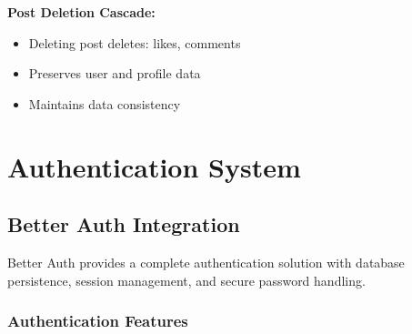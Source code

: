 \documentclass[12pt,a4paper]{report}
\begin{document}
\textbf{Post Deletion Cascade:}
\begin{itemize}
    \item Deleting post deletes: likes, comments
    \item Preserves user and profile data
    \item Maintains data consistency
\end{itemize}

\chapter{Authentication System}

\section{Better Auth Integration}

Better Auth provides a complete authentication solution with database persistence, session management, and secure password handling.

\subsection{Authentication Features}
\end{document}

